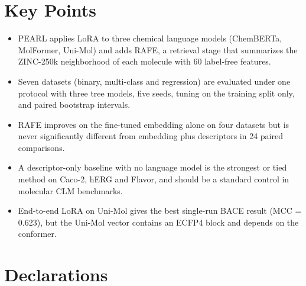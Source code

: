 \documentclass[pdflatex,sn-mathphys-num]{sn-jnl}%
\begin{document}
\section*{Key Points}
\begin{itemize}

\item PEARL applies LoRA to three chemical language models (ChemBERTa, MolFormer, Uni-Mol) and adds RAFE, a retrieval stage that summarizes the ZINC-250k neighborhood of each molecule with 60 label-free features.
\item Seven datasets (binary, multi-class and regression) are evaluated under one protocol with three tree models, five seeds, tuning on the training split only, and paired bootstrap intervals.
\item RAFE improves on the fine-tuned embedding alone on four datasets but is never significantly different from embedding plus descriptors in 24 paired comparisons.
\item A descriptor-only baseline with no language model is the strongest or tied method on Caco-2, hERG and Flavor, and should be a standard control in molecular CLM benchmarks.
\item End-to-end LoRA on Uni-Mol gives the best single-run BACE result (MCC = 0.623), but the Uni-Mol vector contains an ECFP4 block and depends on the conformer.

\end{itemize}
\backmatter

\section*{Declarations}
\end{document}
